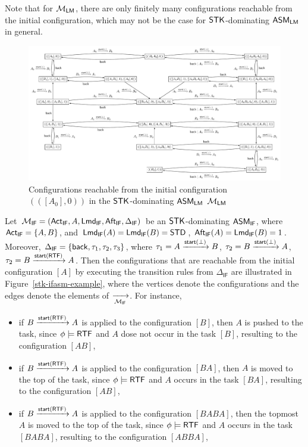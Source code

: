 \begin{example}
\begin{itemize}
	\end{itemize}
	Note that for ${\mathcal{M} }_{\textsf{LM}}$, there are only finitely many configurations reachable from the initial configuration, which may not be the case for $\mathsf{STK}$-dominating $\textsf{ASM}_\textsf{LM}$ in general.  
	\begin{figure}
			\centering
			\includegraphics[scale = 0.55]{stk-lmasm-example.pdf}
			\caption{Configurations reachable from the initial configuration $(([A_0], 0))$ in the $\mathsf{STK}$-dominating $\textsf{ASM}_\textsf{LM}$ ${\mathcal{M} }_{\textsf{LM}}$}
		\label{stk-lmasm-example}
	\end{figure}

Let ${\mathcal{M} }_{\textsf{IF}}=({\sf Act}_{\textsf{IF}},A,{\sf Lmd}_{\textsf{IF}},{\sf Aft}_{\textsf{IF}},\Delta_{\textsf{IF}})$ be an $\mathsf{STK}$-dominating $\textsf{ASM}_\textsf{IF}$, where ${\sf Act}_{\textsf{IF}} = \{A, B\}$, and ${\sf Lmd}_{\textsf{IF}}(A) = {\sf Lmd}_{\textsf{IF}}(B) = \mathsf{STD}$, ${\sf Aft}_{\textsf{IF}}(A) = {\sf Lmd}_{\textsf{IF}}(B) = 1$.
	Moreover, $\Delta_{\textsf{IF}} = \{{\mathsf{back} }, \tau_1, \tau_2, \tau_3 \}$, where 
	$\tau_1 = A\xrightarrow[]{{\mathsf{start} }(\bot)}B$,
	$\tau_2 = B\xrightarrow[]{{\mathsf{start} }(\bot)}A$,
	$\tau_2 = B\xrightarrow[]{{\mathsf{start} }({\sf RTF})}A$.
	Then the configurations that are reachable from the initial configuration $[A]$ by executing the transition rules from $\Delta_{\textsf{IF}}$ are illustrated in Figure~\ref{stk-ifasm-example}, where the vertices denote the configurations and the edges denote the elements of $\xrightarrow[{\mathcal{M} }_{\textsf{IF}}]{}$. 
	For instance, 
	\begin{itemize}
	\item if $B \xrightarrow{{\mathsf{start} }({\sf RTF})} A$ is applied to the configuration $[B]$, then $A$ is pushed to the task, since $\phi\models{\sf RTF}$ and $A$ dose not occur in the task $[B]$, resulting to the configuration $[AB]$,
	\item if $B \xrightarrow{{\mathsf{start} }({\sf RTF})} A$ is applied to the configuration $[BA]$, then $A$ is moved to the top of the task, since $\phi\models{\sf RTF}$ and $A$ occurs in the task $[BA]$, resulting to the configuration $[AB]$,
	\item if $B \xrightarrow{{\mathsf{start} }({\sf RTF})} A$ is applied to the configuration $[BABA]$, then the topmost $A$ is moved to the top of the task, since $\phi\models{\sf RTF}$ and $A$ occurs in the task $[BABA]$, resulting to the configuration $[ABBA]$,


\end{itemize}
\end{example}
